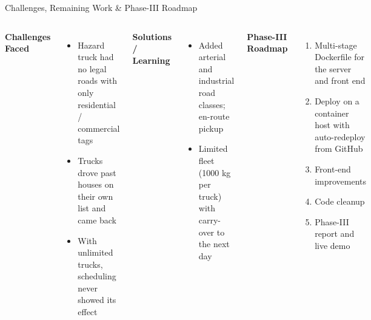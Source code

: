 \documentclass[aspectratio=169,11pt]{beamer}
\begin{document}
\begin{frame}{Challenges, Remaining Work \& Phase-III Roadmap}
\footnotesize

\begin{columns}[T,totalwidth=\textwidth]


\textbf{\color{GEUBlue}Challenges Faced}

\begin{itemize}\itemsep2pt
\item Hazard truck had no legal roads with only residential / commercial tags
\item Trucks drove past houses on their own list and came back
\item With unlimited trucks, scheduling never showed its effect
\end{itemize}

\vspace{2mm}

\textbf{\color{GEUBlue}Solutions / Learning}

\begin{itemize}\itemsep2pt
\item Added arterial and industrial road classes; en-route pickup
\item Limited fleet (1000 kg per truck) with carry-over to the next day
\end{itemize}


\textbf{\color{GEUBlue}Phase-III Roadmap}

\begin{enumerate}\itemsep3pt
\item Multi-stage Dockerfile for the server and front end
\item Deploy on a container host with auto-redeploy from GitHub
\item Front-end improvements
\item Code cleanup
\item Phase-III report and live demo
\end{enumerate}

\end{columns}

\end{frame}
\end{document}
